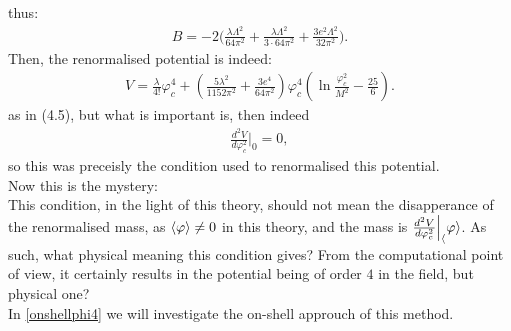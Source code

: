 thus:
\begin{align}\label{CW_B_dm}
B = -2\Big(
\frac{\lambda\Lambda^2}{64\pi^2}+ 
\frac{\lambda\Lambda^2}{3\cdot 64\pi^2}+
\frac{3e^2\Lambda^2}{32\pi^2}\Big). 
\end{align}
Then, the renormalised potential is indeed:
\begin{align}
V = \frac{\lambda}{4!}\varphi_c^4+
\left(\frac{5\lambda^2}{1152\pi^2}+\frac{3e^4}{64\pi^2}\right)\varphi_c^4
\left(\ln\frac{\varphi_c^2}{M^2}-\frac{25}{6}\right).
\end{align}
as in \cite{Coleman1973}(4.5), but what is important is, then indeed
\begin{align}
\frac{d^2V}{d\varphi_c^2}\Big|_0=0,
\end{align}
so this was preceisly the condition used to renormalised this potential. \\
Now this is the mystery: \\
This condition, in the light of this theory, should not mean the disapperance of the renormalised 
mass, as $\langle\varphi\rangle \neq 0$ in this theory, and the mass is $\frac{d^2V}{d\varphi_c^2}\Big|_\langle\varphi\rangle$. 
As such, what physical meaning this condition gives? 
From the computational point of view, it certainly results in the potential being of order $4$ 
in the field, but physical one? \\
In \ref{onshellphi4} we will investigate the on-shell approuch of this method.













